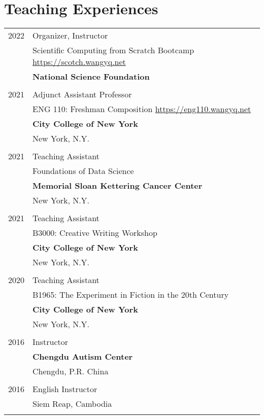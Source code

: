 \documentclass[letterpaper,10pt]{article}
\begin{document}
\section{Teaching Experiences}
\begin{longtable}{p{} p{} }
\textsc{2022} & Organizer, Instructor \\
 & Scientific Computing from Scratch Bootcamp \url{https://scotch.wangyq.net} \\
 & \textbf{National Science Foundation}\\\\

\textsc{2021} & Adjunct Assistant Professor \\
 & ENG 110: Freshman Composition \url{https://eng110.wangyq.net} \\
 & \textbf{City College of New York}\\
 & New York, N.Y.\\\\
 
 \textsc{2021} & Teaching Assistant \\
 & Foundations of Data Science \\
 & \textbf{Memorial Sloan Kettering Cancer Center} \\
 & New York, N.Y.\\\\
 
  \textsc{2021} & Teaching Assistant \\
 & B3000: Creative Writing Workshop \\
 & \textbf{City College of New York}\\
 & New York, N.Y.\\\\
 
 \textsc{2020} & Teaching Assistant \\
 & B1965: The Experiment in Fiction in the 20th Century\\
 & \textbf{City College of New York}\\
 & New York, N.Y.\\\\
 
 \textsc{2016} & Instructor\\
 & \textbf{Chengdu Autism Center} \\
 & Chengdu, P.R. China\\\\
 
  \textsc{2016} & English Instructor \\
 & Siem Reap, Cambodia\\\\
 \end{longtable}
\end{document}
